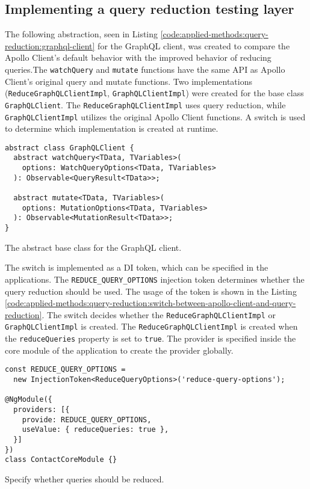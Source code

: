 \subsection{Implementing a query reduction testing layer}\label{subsection:applied-methods:query-reduction:testing-query-reduction}

The following abstraction, seen in Listing \ref{code:applied-methods:query-reduction:graphql-client} for the GraphQL client, was created to compare the Apollo Client's default behavior with the improved behavior of reducing queries.The \texttt{watchQuery} and \texttt{mutate} functions have the same \ac{API} as Apollo Client's original query and mutate functions. Two implementations (\texttt{ReduceGraphQLClientImpl}, \texttt{GraphQLClientImpl}) were created for the base class \texttt{GraphQLClient}. The \texttt{ReduceGraphQLClientImpl} uses query reduction, while \texttt{GraphQLClientImpl} utilizes the original Apollo Client functions. A switch is used to determine which implementation is created at runtime.

\ifshowListings
\begin{listing}[H]
\begin{verbatim}
abstract class GraphQLClient {
  abstract watchQuery<TData, TVariables>(
    options: WatchQueryOptions<TData, TVariables>
  ): Observable<QueryResult<TData>>;

  abstract mutate<TData, TVariables>(
    options: MutationOptions<TData, TVariables>
  ): Observable<MutationResult<TData>>;
}
\end{verbatim}
\caption{The abstract base class for the GraphQL client.}\label{code:applied-methods:query-reduction:graphql-client}
\end{listing}
\fi

\noindent The switch is implemented as a \ac{DI} token, which can be specified in the applications. The \texttt{REDUCE\_QUERY\_OPTIONS} injection token determines whether the query reduction should be used. The usage of the token is shown in the Listing \ref{code:applied-methods:query-reduction:switch-between-apollo-client-and-query-reduction}. The switch decides whether the \texttt{ReduceGraphQLClientImpl} or \texttt{GraphQLClientImpl} is created. The \texttt{ReduceGraphQLClientImpl} is created when the \texttt{reduceQueries} property is set to \texttt{true}. The provider is specified inside the core module of the application to create the provider globally.

\ifshowListings
\begin{listing}[H]
\begin{verbatim}
const REDUCE_QUERY_OPTIONS = 
  new InjectionToken<ReduceQueryOptions>('reduce-query-options');

@NgModule({
  providers: [{
    provide: REDUCE_QUERY_OPTIONS,
    useValue: { reduceQueries: true },
  }]
})
class ContactCoreModule {}
\end{verbatim}
\caption{Specify whether queries should be reduced.}\label{code:applied-methods:query-reduction:switch-between-apollo-client-and-query-reduction}
\end{listing}
\fi

